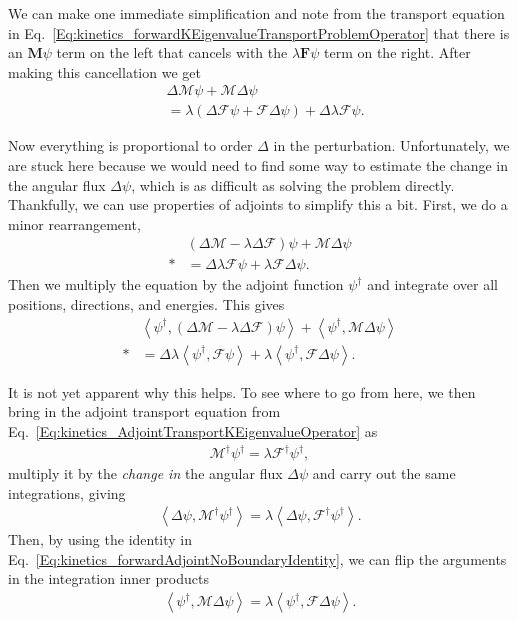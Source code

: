 We can make one immediate simplification and note from the transport equation in Eq.~\eqref{Eq:kinetics_forwardKEigenvalueTransportProblemOperator} that there is an $\mathbf{M}\psi$ term on the left that cancels with the $\lambda \mathbf{F} \psi$ term on the right. After making this cancellation we get
\begin{align}
  &\Delta \mathcal{M} \psi + \mathcal{M} \Delta \psi \nonumber \\
  &= \lambda ( \Delta \mathcal{F} \psi + \mathcal{F} \Delta \psi ) + \Delta \lambda \mathcal{F} \psi. \label{Eq:kinetics_linearPerturbationDerivation_step4}
\end{align}

Now everything is proportional to order $\Delta$ in the perturbation. Unfortunately, we are stuck here because we would need to find some way to estimate the change in the angular flux $\Delta \psi$, which is as difficult as solving the problem directly. Thankfully, we can use properties of adjoints to simplify this a bit. First, we do a minor rearrangement,
\begin{align}
  &( \Delta \mathcal{M} - \lambda \Delta \mathcal{F} ) \psi + \mathcal{M} \Delta \psi \nonumber \\*
  &= \Delta \lambda \mathcal{F} \psi + \lambda \mathcal{F} \Delta \psi .
\end{align}
Then we multiply the equation by the adjoint function $\psi^\dagger$ and integrate over all positions, directions, and energies. This gives
\begin{align}
  &\left< \psi^\dagger, ( \Delta \mathcal{M} - \lambda \Delta \mathcal{F} ) \psi \right> + \left< \psi^\dagger, \mathcal{M} \Delta \psi \right> \nonumber \\*
  &= \Delta \lambda \left< \psi^\dagger, \mathcal{F} \psi \right> + \lambda \left< \psi^\dagger, \mathcal{F} \Delta \psi \right>. \label{Eq:kinetics_linearPerturbationDerivation_step5}
\end{align}

It is not yet apparent why this helps. To see where to go from here, we then bring in the adjoint transport equation from Eq.~\eqref{Eq:kinetics_AdjointTransportKEigenvalueOperator} as
\begin{align}
  \mathcal{M}^\dagger \psi^\dagger = \lambda \mathcal{F}^\dagger \psi^\dagger , \nonumber
\end{align}
multiply it by the \emph{change in} the angular flux $\Delta \psi$ and carry out the same integrations, giving
\begin{align}
  \left< \Delta \psi, \mathcal{M}^\dagger \psi^\dagger \right> = \lambda \left< \Delta \psi, \mathcal{F}^\dagger \psi^\dagger \right> . 
\end{align}
Then, by using the identity in Eq.~\eqref{Eq:kinetics_forwardAdjointNoBoundaryIdentity}, we can flip the arguments in the integration inner products
\begin{align}
  \left< \psi^\dagger , \mathcal{M} \Delta \psi \right> = \lambda \left< \psi^\dagger , \mathcal{F} \Delta \psi \right> . 
\end{align}

